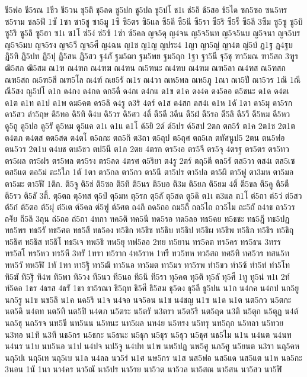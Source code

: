 {ชี5ฟอ
ชี5รณ
1ชีว
ชี5วน
ชุ5ติ
ชุ5ลด
ชู5ปก
ชู5ปถ
ชู5ปโ
ช1เ
ช่5อิ
ช้5สอ
ช้5ได
ซก5ซอ
ซน5ทร
ซ5ราม
ซล5ฟี
1ซั
1ซา
ซา5ชู
ซา5มู
1ซิ
ซิ5ตร
ซิ5แล
ซี5ดี
ซี5นี
ซี5รา
ซี5ริ
ซี5ร็
ซี5ลี
3ซึม
ซู5ซู
ซู5บิ
ซู5ริ
ซู5ลิ
ซู5ฮา
ซ1เ
ซ1โ
ซ่5ง่
ซ่5ซ้
1ซ่า
ซ์5คล
ญจ5ดุ
ญ4จน
ญ5จ5นท
ญ5จ5นบ
ญ5จนา
ญจ5บร
ญ5จ5มบ
ญจ5รง
ญจ5วี
ญจ5ศี
ญ4ฉน
ญ1ช
ญ1ญ
ญประ4
1ญา
ญา5ญ่
ญา4ต
ญ่5บ้
ฏ1ฐ
ฏ4ฐบ
ฏิ5ทิ
ฏิ5ปท
ฏิ5ปุ
ฏิ5สน
ฏิ5สว
ฐ4ภั
ฐม5ฌา
ฐม5พย
ฐม5ฤก
1ฐา
ฐา5นี
ฐุ5ชุ
ฑา5มณ
ฑา5สถ
3ฑูร
ฒิ5สภ
ฒิ5สม
ณ1ฑ
ณ4ฑก
ณ4ฑฆ
ณ4ฑน
ณ5ฑนะ
ณ4ฑบ
ณ4ฑม
ณฑ5ลา
ณ4ฑส
ณ5ฑสก
ณฑ5สถ
ณ5ฑ5สี
ณฑ5โล
ณ4ฑ์
ณย5รั
ณ1ร
ณ4วา
ณห5พล
ณห5ภู
1ณา
ณา5ปี
ณา5วร
1ณิ
1ณี
ณี5สง
ณู5ปโ
ด1ก
ด4กง
ด4กด
ดก5ดื
ด4กเ
ด4กแ
ด1ข
ด1ค
ดง4ค
ดง5ออ
ด5ชนะ
ด1ด
ด4ดเ
ด1ต
ด1ท
ด1ป
ด1พ
ดม5คต
ดร5ลิ
ด4รู
ด3ร้
4ดร์
ด1ส
ด4สก
ดส4เ
ด1ห
1ดั
1ดา
ดา5มุ
ดา5รก
ดา5สว
ดำ5ฤษ
ดิ5ทอ
ดิ5ทิ
ดิ4บ
ดิ5วร
ดิ5ศว
4ดิ์
ดี5ดี
3ดีน
ดี5ฝ่
ดี5รอ
ดี5ลิ
ดี5วี
ดี5หม
ดี5หว
ดู5ถู
ดู5ปอ
ดู5รั
ดู5หม
ดู5แค
ด1เ
ด1แ
ด1โ
ด้5ยิ
2ด์
ด์5ปร
ด์5สป
2ตก
ตก5ร้
ต1ค
2ต1ช
2ต1ต
ต4ตภ
ต4ตส
ตต5สด
ต4ตโ
ต5ถกะ
ตถ5กิ
ต3ถา
ต5ถุป
ต5ถุศ
ตถ5เล
ตทัศนูป5
2ตน
ตน5ฟอ
ตน5วร
2ต1บ
ต4บช
ตบ5ชว
ตป5นี
ต1ภ
2ตย
4ตรก
ตร5งอ
ตร5จี
ตร5จุ
4ตรฐ
ตร5ตร
ตร5ทว
ตร5ผล
ตร5ฝร
ตร5พล
ตร5รง
ตร5ลด
4ตรศ
ต5ริยา
ต4รู
2ตร์
ตฤ5ตี
ตล5รั
ตส5วา
ตส4เ
ตส5เซ
ตส5แต
ตอ5ม่
ตะ5ใภ
1ตั
1ตา
ตา5กล
ตา5กว
ตา5นึ
ตา5ปร
ตา5ปล
ตา5ผิ
ตา5ฟู
ตา3มห
ตา5มอ
ตา5มะ
ตา5ฬี
1ติก.
ติ5จู
ติ5ช่
ติ5ซอ
ติ5ทิ
ติ5นร
ติ5บอ
ติ3ม
ติ5ยภ
ติ5ยม
4ติ์
ตี5ขล
ตี5คู
ตี5ตื
ตี5รว
ตี5ลั
3ตี้.
ตุ5ตถ
ตุ5ทส
ตุ5ป่
ตุ5มห
ตุ5รก
ตุ5ลั
ตุ5สด
ตู5ดิ
ต1เ
ต3แล
ต1โ
ต่5ถา
ต่5ว่
ต่5สว
ต้5ก๋
ต้5ตอ
ต้5ฝุ
ต๋5เต
ต์5คล
ต์5ฟู
ต์5ศต
ถ4กิ
ถด5ถอ
ถม5ถื
ถล5ไถ
ถว5ไม
ถะ5ถั
ถ4าธ
ถา5วร
ถ4ีย
ถี5ลิ
3ถุน
ถ่5ถอ
ถ่5ถา
4ทกา
ทค5ติ
ทค5นี
ทด5รอ
ทด5ลอ
ทธ5คย
ท5ธชะ
ทธ5ฎี
ทธ5ปฏ
ทธ5พร
ทธ5รั
ทธ5ศต
ทธ5สี
ทธ5อง
ท5ธิก
ท5ธิช
ท5ธิบ
ท5ธิป
ท5ธิผ
ท5ธิพ
ท5ธิภ
ท5ธิร
ท5ธิฤ
ท5ธิศ
ท5ธิส
ท5ธิโ
ทธ5เจ
ทพ5ธิ
ทพ5ยุ
ทฟ5ลอ
2ทย
ท5ยาน
ทร5คต
ทร5คร
ทร5ธน
3ทรร
ทร5สโ
ทร5หว
ทร5หึ
3ทรั
1ทรา
ท5ราก
4ท5ราห
1ทรี
ทว5ทห
ทว5สถ
ทศ5ทิ
ทศ5วร
ทสน5ท
ทห5วั
ทห5ฬิ
1ทั
1ทา
ทา5ฐิ
ทา5ฒิ
ทา5นอ
ทา5มต
ทา5มร
ทา5รพ
ทำ5ขว
ทำ5ซ้
ทำ5ท่
ทำ5โท
ทิ5ฆั
ทิ5ฐิ
ทิ4พ
ทิ5พา
ทิ5วง
ที5นว
ที5นอ
ที5นี
ที5รา
ทุ5คต
ทุ5ติ
ทุ5ลั
ทุ5ศี
1ทู
ทู5น่
ท1เ
2ท์
ท์5ดอ
1ธร
4ธรส
4ธรั
1ธา
ธา5รณา
ธิ5ฤท
ธิ5ศี
ธิ5สม
ธุ5ดง
ธุ5ลี
ธู5ปน
น1ก
น4กค
น4กป
นก5ยู
นก5รู
น1ข
นข5ลิ
น1ค
นค5ริ
น1จ
น4จอ
นจ5อน
น1ช
น4ชญ
น1ซ
น1ด
น1ต
นต5กว
น5ตกะ
นต5ดิ
น4ตท
นต5ทิ
นต5ปิ
น4ตภ
น5ตระ
น5ตรั
น3ตรา
น5ต5ริ
นต5ฤด
น3ติ
น5ตุก
น5ตุฏ
น4ต์
นถ5ธุ
นถ5รจ
นท5ขี
นท5นน
น5ทนะ
นท5ผล
นท4ย
น5ทรง
น5ทรุ
นท5ฤก
น5ทลา
น5ทวย
น3ทอ
น1ทิ
น3ที
นธ5กร
น5ธกะ
น5ธนะ
น5ธุก
น5ธุร
น5ธุว
น5ธุศ
นธ5ไม
น1น
น4นต
น4นท
น4นร
น1บ
นบ5นอ
น1ป
น4ปจ
นป5จู
น4ปท
น1พ
นพ5ปฎ
นพ5ศู
นภ5ศู
น5ยนต
น3รา
นฤ5คห
นฤ5ปเ
นฤ5เท
นฤ5เบ
น1ล
น4ลล
นว5ร่
น1ศ
นษ5กร
น1ส
นส5ฟอ
นส5แด
นส5แต
น1ห
นอ5กะ
3นอน
1นั
1นา
นา4คร
นา5ณั
นา5ปร
นา5รย
นา5วต
นา5วล
นา5สณ
นา5สน
นา5สว
นา5ฬิ
}
